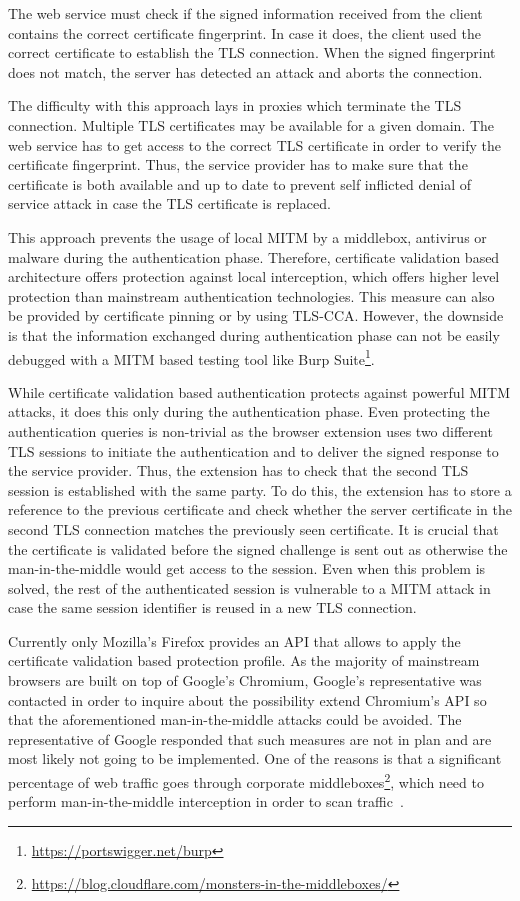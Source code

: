 The web service must check if the signed information received from the client contains the correct certificate fingerprint. In case it does, the client used the correct certificate to establish the TLS connection. When the signed fingerprint does not match, the server has detected an attack and aborts the connection.

The difficulty with this approach lays in proxies which terminate the TLS connection. Multiple TLS certificates may be available for a given domain. The web service has to get access to the correct TLS certificate in order to verify the certificate fingerprint. Thus, the service provider has to make sure that the certificate is both available and up to date to prevent self inflicted denial of service attack in case the TLS certificate is replaced.

This approach prevents the usage of local MITM by a middlebox, antivirus or malware during the authentication phase. Therefore, certificate validation based architecture offers protection against local interception, which offers higher level protection than mainstream authentication technologies. This measure can also be provided by certificate pinning or by using TLS-CCA. However, the downside is that the information exchanged during authentication phase can not be easily debugged with a MITM based testing tool like Burp Suite\footnote{\url{https://portswigger.net/burp}}.

While certificate validation based authentication protects against powerful MITM attacks, it does this only during the authentication phase. Even protecting the authentication queries is non-trivial as the browser extension uses two different TLS sessions to initiate the authentication and to deliver the signed response to the service provider. Thus, the extension has to check that the second TLS session is established with the same party. To do this, the extension has to store a reference to the previous certificate and check whether the server certificate in the second TLS connection matches the previously seen certificate. It is crucial that the certificate is validated before the signed challenge is sent out as otherwise the man-in-the-middle would get access to the session. Even when this problem is solved, the rest of the authenticated session is vulnerable to a MITM attack in case the same session identifier is reused in a new TLS connection.

Currently only Mozilla's Firefox provides an API that allows to apply the certificate validation based protection profile. As the majority of mainstream browsers are built on top of Google's Chromium, Google's representative was contacted in order to inquire about the possibility extend Chromium's API so that the aforementioned man-in-the-middle attacks could be avoided. The representative of Google responded that such measures are not in plan and are most likely not going to be implemented. One of the reasons is that a significant percentage of web traffic goes through corporate middleboxes\footnote{\url{https://blog.cloudflare.com/monsters-in-the-middleboxes/}}, which need to perform man-in-the-middle interception in order to scan traffic~\cite{DBLP:conf/ndss/DurumericMSBSBB17}.


